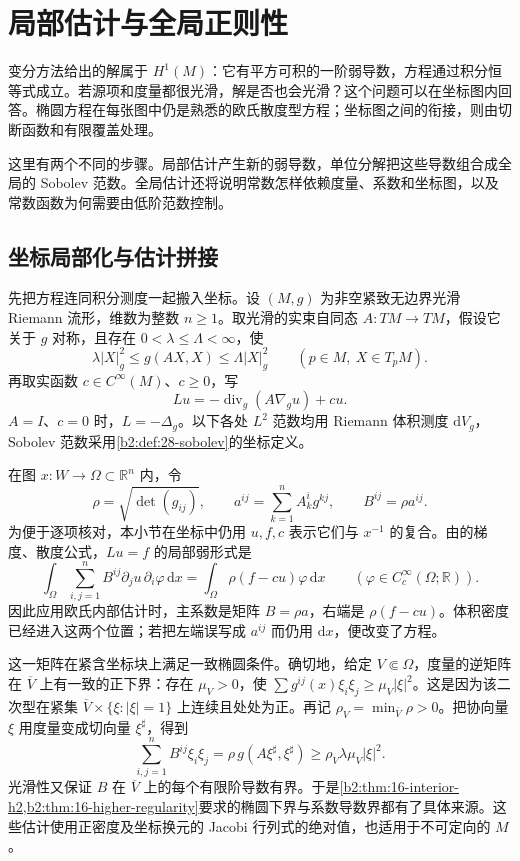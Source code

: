 \section{局部估计与全局正则性}
\label{b2:sec:2604}

变分方法给出的解属于 \(H^1(M)\)：它有平方可积的一阶弱导数，方程通过积分恒等式成立。若源项和度量都很光滑，解是否也会光滑？这个问题可以在坐标图内回答。椭圆方程在每张图中仍是熟悉的欧氏散度型方程；坐标图之间的衔接，则由切断函数和有限覆盖处理。

这里有两个不同的步骤。局部估计产生新的弱导数，单位分解把这些导数组合成全局的 Sobolev 范数。全局估计还将说明常数怎样依赖度量、系数和坐标图，以及常数函数为何需要由低阶范数控制。

\subsection{坐标局部化与估计拼接}
\label{b2:subsec:260401}

先把方程连同积分测度一起搬入坐标。设 \((M,g)\) 为非空紧致无边界光滑 Riemann 流形，维数为整数 \(n\geq1\)。取光滑的实束自同态 \(A:TM\to TM\)，假设它关于 \(g\) 对称，且存在 \(0<\lambda\leq\Lambda<\infty\)，使
\[
 \lambda |X|_g^2\leq g(AX,X)\leq\Lambda |X|_g^2
 \qquad(p\in M,\ X\in T_pM).
\]
再取实函数 \(c\in C^\infty(M)\)、\(c\geq0\)，写
\[
 Lu=-\operatorname{div}_g(A\nabla_g u)+cu.
\]
\(A=I\)、\(c=0\) 时，\(L=-\Delta_g\)。以下各处 \(L^2\) 范数均用 Riemann 体积测度 \(\mathrm dV_g\)，Sobolev 范数采用\cref{b2:def:28-sobolev}的坐标定义。

在图 \(x:W\to\Omega\subset\mathbb R^n\) 内，令
\[
 \rho=\sqrt{\det(g_{ij})},\qquad
 a^{ij}=\sum_{k=1}^n A^i_k g^{kj},\qquad B^{ij}=\rho a^{ij}.
\]
为便于逐项核对，本小节在坐标中仍用 \(u,f,c\) 表示它们与 \(x^{-1}\) 的复合。由的梯度、散度公式，\(Lu=f\) 的局部弱形式是
\begin{equation}\label{b2:eq:28-coordinate-weak-regularity}
 \int_\Omega\sum_{i,j=1}^n B^{ij}\partial_j u\,\partial_i\varphi\,\mathrm dx
 =\int_\Omega \rho(f-cu)\varphi\,\mathrm dx
 \qquad(\varphi\in C_c^\infty(\Omega;\mathbb R)).
\end{equation}
因此应用欧氏内部估计时，主系数是矩阵 \(B=\rho a\)，右端是 \(\rho(f-cu)\)。体积密度已经进入这两个位置；若把左端误写成 \(a^{ij}\) 而仍用 \(\mathrm dx\)，便改变了方程。

这一矩阵在紧含坐标块上满足一致椭圆条件。确切地，给定 \(V\Subset\Omega\)，度量的逆矩阵在 \(\overline V\) 上有一致的正下界：存在 \(\mu_V>0\)，使
\(\sum g^{ij}(x)\xi_i\xi_j\geq\mu_V|\xi|^2\)。这是因为该二次型在紧集 \(\overline V\times\{\xi:|\xi|=1\}\) 上连续且处处为正。再记 \(\rho_V=\min_{\overline V}\rho>0\)。把协向量 \(\xi\) 用度量变成切向量 \(\xi^\sharp\)，得到
\[
 \sum_{i,j=1}^n B^{ij}\xi_i\xi_j
 =\rho\,g(A\xi^\sharp,\xi^\sharp)
 \geq\rho_V\lambda\mu_V|\xi|^2.
\]
光滑性又保证 \(B\) 在 \(\overline V\) 上的每个有限阶导数有界。于是\cref{b2:thm:16-interior-h2,b2:thm:16-higher-regularity}要求的椭圆下界与系数导数界都有了具体来源。这些估计使用正密度及坐标换元的 Jacobi 行列式的绝对值，也适用于不可定向的 \(M\)。

